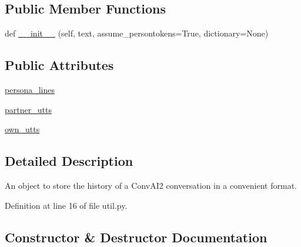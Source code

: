 \subsection*{Public Member Functions}
\begin{DoxyCompactItemize}
\item 
def \hyperlink{classprojects_1_1controllable__dialogue_1_1controllable__seq2seq_1_1util_1_1ConvAI2History_ab28df6476a9460112e5a00eafba01c4c}{\+\_\+\+\_\+init\+\_\+\+\_\+} (self, text, assume\+\_\+persontokens=True, dictionary=None)
\end{DoxyCompactItemize}
\subsection*{Public Attributes}
\begin{DoxyCompactItemize}
\item 
\hyperlink{classprojects_1_1controllable__dialogue_1_1controllable__seq2seq_1_1util_1_1ConvAI2History_a45addcda1344d422a0a8d29598944884}{persona\+\_\+lines}
\item 
\hyperlink{classprojects_1_1controllable__dialogue_1_1controllable__seq2seq_1_1util_1_1ConvAI2History_af543c29eeb1a89f33388640305f16c84}{partner\+\_\+utts}
\item 
\hyperlink{classprojects_1_1controllable__dialogue_1_1controllable__seq2seq_1_1util_1_1ConvAI2History_a12340ae0e928a10c22ea9abfebf02b30}{own\+\_\+utts}
\end{DoxyCompactItemize}


\subsection{Detailed Description}
\begin{DoxyVerb}An object to store the history of a ConvAI2 conversation in a convenient format.
\end{DoxyVerb}
 

Definition at line 16 of file util.\+py.



\subsection{Constructor \& Destructor Documentation}
\mbox{\label{classprojects_1_1controllable__dialogue_1_1controllable__seq2seq_1_1util_1_1ConvAI2History_ab28df6476a9460112e5a00eafba01c4c}} 
